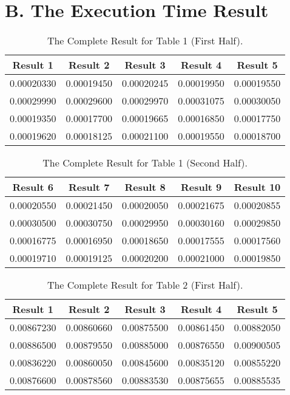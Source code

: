 \documentclass[12pt]{article}
\begin{document}
\section*{B. The Execution Time Result}
\begin{table}[h]
\centering
\begin{tabular}{|c|c|c|c|c|}\hline
Result 1&Result 2&Result 3&Result 4&Result 5\\\hline
0.00020330&0.00019450&0.00020245&0.00019950&0.00019550\\
0.00029990&0.00029600&0.00029970&0.00031075&0.00030050\\\hline
0.00019350&0.00017700&0.00019665&0.00016850&0.00017750\\
0.00019620&0.00018125&0.00021100&0.00019550&0.00018700\\\hline
\end{tabular}
\caption{The Complete Result for Table 1 (First Half).}
\label{tab:Margin_settings}
\end{table}
\begin{table}[h]
\centering
\begin{tabular}{|c|c|c|c|c|}\hline
Result 6&Result 7&Result 8&Result 9&Result 10\\\hline
0.00020550&0.00021450&0.00020050&0.00021675&0.00020855\\
0.00030500&0.00030750&0.00029950&0.00030160&0.00029850\\\hline
0.00016775&0.00016950&0.00018650&0.00017555&0.00017560\\
0.00019710&0.00019125&0.00020200&0.00021000&0.00019850\\\hline
\end{tabular}
\caption{The Complete Result for Table 1 (Second Half).}
\label{tab:Margin_settings}
\end{table}
\begin{table}[h]
\centering
\begin{tabular}{|c|c|c|c|c|}\hline
Result 1&Result 2&Result 3&Result 4&Result 5\\\hline
0.00867230&0.00860660&0.00875500&0.00861450&0.00882050\\
0.00886500&0.00879550&0.00885000&0.00876550&0.00900505\\\hline
0.00836220&0.00860050&0.00845600&0.00835120&0.00855220\\
0.00876600&0.00878560&0.00883530&0.00875655&0.00885535\\\hline
\end{tabular}
\caption{The Complete Result for Table 2 (First Half).}
\label{tab:Margin_settings}
\end{table}
\end{document}
